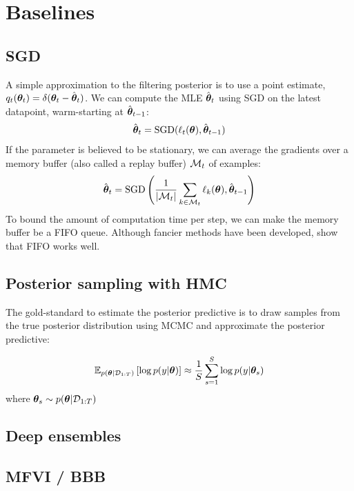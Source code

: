 \section{Baselines}

\subsection{SGD}

A simple approximation to the filtering posterior
is to use a point estimate,
$q_t(\vtheta_t) = \delta(\vtheta_t - \hat{\vtheta}_t)$.
We can compute the MLE %
$\hat{\vtheta}_t$ using SGD
on the latest datapoint, warm-starting at $\hat{\vtheta}_{t-1}$:
\begin{align}
\hat{\vtheta}_t = \text{SGD}(\ell_t(\vtheta), \hat{\vtheta}_{t-1})
\end{align}
If the parameter is believed to be stationary, we can average the gradients over a memory buffer 
(also called a replay buffer) $\calM_t$ of examples:
\begin{align}
\hat{\vtheta}_t = \text{SGD}\left(
\frac{1}{|\calM_t|} \sum_{k \in \calM_t}
\ell_k(\vtheta), \hat{\vtheta}_{t-1}\right)
\end{align}
To bound the amount of computation time per step,
we can make the memory buffer be a FIFO queue. 
Although fancier methods have been developed,
\citep{Bornschein2022} show that FIFO works well.

\subsection{Posterior sampling with HMC}
The gold-standard to estimate the posterior predictive is to draw samples from the true
posterior distribution using MCMC and approximate the posterior predictive:

\begin{align}
\expectQ{\log p(y|\vtheta)}{p(\vtheta \vert \mathcal{D}_{1:T})}
 \approx \frac{1}{S} \sum_{s=1}^S \log p(y|\vtheta_s)
\end{align}
where $\vtheta_s \sim p(\vtheta \vert \mathcal{D}_{1:T})$

\subsection{Deep ensembles}

\subsection{MFVI / BBB}

